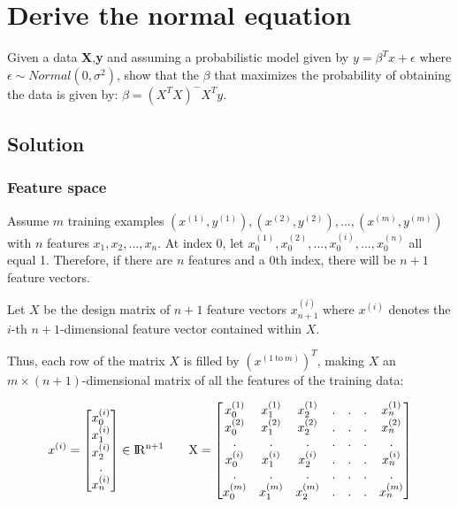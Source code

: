\documentclass{article}
\begin{document}
    \section{Derive the normal equation}
	Given a data \textbf{X},\textbf{y} and assuming a probabilistic model given by $y=\beta^{T}x+\epsilon$ where $\epsilon\sim Normal(0,\sigma^2)$, show that the $\beta$ that maximizes the probability of obtaining the data is given by: $\beta=(X^{T}X)^{-}X^{T}y$.
	
	\subsection{Solution}
	\subsubsection{Feature space}
	Assume $m$ training examples $(x^{(1)},y^{(1)}),(x^{(2)},y^{(2)}),...,(x^{(m)},y^{(m)})$ with $n$ features $x_1, x_2,...,x_n$. At index 0, let $x^{(1)}_0, x^{(2)}_0,..., x^{(i)}_0,...,x^{(n)}_0$ all equal 1. Therefore, if there are $n$ features and a 0th index, there will be $n+1$ feature vectors.
	
	Let $X$ be the design matrix of $n+1$ feature vectors $x^{(i)}_{n+1}$ where $x^{(i)}$ denotes the $i$-th $n+1$-dimensional feature vector contained within $X$. 
	
	Thus, each row of the matrix $X$ is filled by $(x^{(1\:\text{to}\:m)})^{T}$, making $X$ an $m\times(n+1)$-dimensional matrix of all the features of the training data:
	
	\begin{equation*}
	x^{(i)} = \begin{bmatrix}
	x^{(i)}_0\\x^{(i)}_1\\x^{(i)}_2\\.\\x^{(i)}_n
	\end{bmatrix}\in\rm I\!R^{n+1}\qquad
	X=\begin{bmatrix}
	x^{(1)}_0&x^{(1)}_1&x^{(1)}_2&.&.&.&x^{(1)}_n\\
	x^{(2)}_0&x^{(2)}_1&x^{(2)}_2&.&.&.&x^{(2)}_n\\
	.&.&.&.&.&.&.\\
	x^{(i)}_0&x^{(i)}_1&x^{(i)}_2&.&.&.&x^{(i)}_n\\
	.&.&.&.&.&.&.\\
	x^{(m)}_0&x^{(m)}_1&x^{(m)}_2&.&.&.&x^{(m)}_n
	\end{bmatrix}
	\end{equation*}
		
\end{document}
